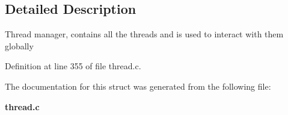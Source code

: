 \subsection{Detailed Description}
Thread manager, contains all the threads and is used to interact with them globally 

Definition at line 355 of file thread.c.



The documentation for this struct was generated from the following file:\begin{DoxyCompactItemize}
\item 
{\bf thread.c}\end{DoxyCompactItemize}
